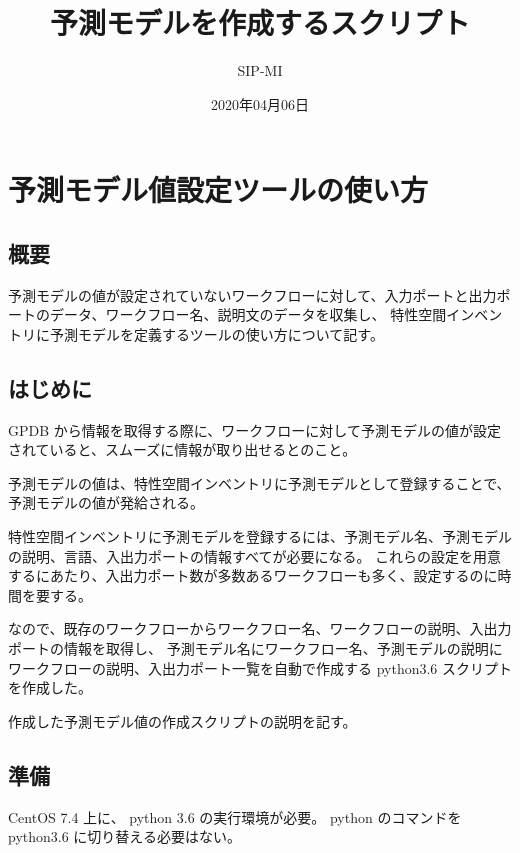 \documentclass[letterpaper,10pt,dvipdfmx,openany]{sphinxmanual}
\title{予測モデルを作成するスクリプト}
\date{2020年04月06日}
\author{SIP-MI}
\begin{document}
\pagestyle{empty}
\sphinxmaketitle
\pagestyle{plain}
\sphinxtableofcontents
\pagestyle{normal}
\label{\detokenize{index::doc}}



\chapter{予測モデル値設定ツールの使い方}
\label{\detokenize{doc/20200218_How2Use_predict_conf_upload:id1}}\label{\detokenize{doc/20200218_How2Use_predict_conf_upload::doc}}

\section{概要}
\label{\detokenize{doc/20200218_How2Use_predict_conf_upload:id2}}
予測モデルの値が設定されていないワークフローに対して、入力ポートと出力ポートのデータ、ワークフロー名、説明文のデータを収集し、
特性空間インベントリに予測モデルを定義するツールの使い方について記す。


\section{はじめに}
\label{\detokenize{doc/20200218_How2Use_predict_conf_upload:id3}}
GPDB から情報を取得する際に、ワークフローに対して予測モデルの値が設定されていると、スムーズに情報が取り出せるとのこと。

予測モデルの値は、特性空間インベントリに予測モデルとして登録することで、予測モデルの値が発給される。

特性空間インベントリに予測モデルを登録するには、予測モデル名、予測モデルの説明、言語、入出力ポートの情報すべてが必要になる。
これらの設定を用意するにあたり、入出力ポート数が多数あるワークフローも多く、設定するのに時間を要する。

なので、既存のワークフローからワークフロー名、ワークフローの説明、入出力ポートの情報を取得し、
予測モデル名にワークフロー名、予測モデルの説明にワークフローの説明、入出力ポート一覧を自動で作成する python3.6 スクリプトを作成した。

作成した予測モデル値の作成スクリプトの説明を記す。


\section{準備}
\label{\detokenize{doc/20200218_How2Use_predict_conf_upload:id4}}
CentOS 7.4 上に、 python 3.6 の実行環境が必要。
python のコマンドを python3.6 に切り替える必要はない。
\end{document}
